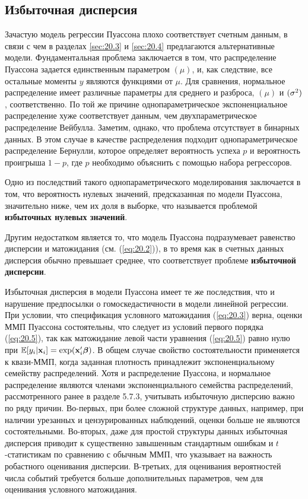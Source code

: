 \subsection{Избыточная дисперсия}\label{sec:20.2.4}

\noindent
Зачастую модель регрессии Пуассона плохо соответствует счетным данным, в связи с чем в разделах \ref{sec:20.3} и \ref{sec:20.4} предлагаются альтернативные модели. Фундаментальная проблема заключается в том, что распределение Пуассона задается единственным параметром $(\mu)$, и, как следствие, все остальные моменты $y$ являются функциями от $\mu$. Для сравнения, нормальное распределение имеет различные параметры для среднего и разброса, $(\mu)$ и $(\sigma^2)$, соответственно. По той же причине однопараметрическое экспоненциальное распределение хуже соответствует данным, чем двухпараметрическое распределение Вейбулла. Заметим, однако, что проблема отсутствует в бинарных данных. В этом случае в качестве распределения подходит однопараметрическое распределение Бернулли, которое определяет вероятность успеха $p$ и вероятность проигрыша $1 - p$, где $p$ необходимо объяснить с помощью набора регрессоров.

Одно из последствий такого однопараметрического моделирования заключается в том, что вероятность нулевых значений, предсказанная по модели Пуассона, значительно ниже, чем их доля в выборке, что называется проблемой \textbf{избыточных нулевых значений}.

Другим недостатком является то, что модель Пуассона подразумевает равенство дисперсии и матожидания (см. (\ref{eq:20.2})), в то время как в счетных данных дисперсия обычно превышает среднее, что соответствует проблеме \textbf{избыточной дисперсии}.

Избыточная дисперсия в модели Пуассона имеет те же последствия, что и нарушение предпосылки о гомоскедастичности в модели линейной регрессии. При условии, что спецификация условного матожидания (\ref{eq:20.3}) верна, оценки ММП Пуассона состоятельны, что следует из условий первого порядка (\ref{eq:20.5}), так как матожидание левой части уравнения (\ref{eq:20.5}) равно нулю при $\mathbb{E}[y_i|\mathbf{x}_i] = \exp(\mathbf{x}_i'\bm{\beta})$. В общем случае свойство состоятельности применяется к квази-ММП, когда заданная плотность принадлежит экспоненциальному семейству распределений. Хотя и распределение Пуассона, и нормальное распределение являются членами экспоненциального семейства распределений, рассмотренного ранее в разделе 5.7.3, учитывать избыточную дисперсию важно по ряду причин. Во-первых, при более сложной структуре данных, например, при наличии урезанных и цензурированных наблюдений, оценки больше не являются состоятельными. Во-вторых, даже для простой структуры данных избыточная дисперсия приводит к существенно завышенным стандартным ошибкам и $t$-статистикам по сравнению с обычным ММП, что указывает на важность робастного оценивания дисперсии. В-третьих, для оценивания вероятностей числа событий требуется больше дополнительных параметров, чем для оценивания условного матожидания.

